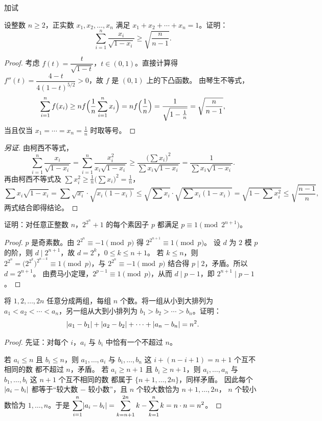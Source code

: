 \documentclass{mojing-exam}
\begin{document}
\begin{paper}[time={9:40—12:10}, full=180]{加试}
\begin{questions}[chinese]
\question[40] 设整数 $n\ge2$，正实数 $x_1,x_2,\dotsc,x_n$ 满足 $x_1+x_2+\dotsb+x_n=1$。证明：
\[
  \sum_{i=1}^{n}\frac{x_i}{\sqrt{1-x_i}}\ge\sqrt{\frac{n}{n-1}} .
\]
\answerspace{8cm}
\begin{proof}
考虑 $f(t)=\dfrac{t}{\sqrt{1-t}}$，$t\in(0,1)$。直接计算得
$f''(t)=\dfrac{4-t}{4(1-t)^{5/2}}>0$，故 $f$ 是 $(0,1)$ 上的下凸函数。
由琴生不等式，
\[
  \sum_{i=1}^nf(x_i)\ge nf\Bigl(\frac{1}{n}\sum_{i=1}^nx_i\Bigr)=nf\Bigl(\frac1n\Bigr)
  =\frac{1}{\sqrt{1-\frac1n}}=\sqrt{\frac{n}{n-1}} ,
\]
当且仅当 $x_1=\dotsb=x_n=\frac1n$ 时取等号。
\end{proof}
\begin{proof}[另证]
由柯西不等式，
\[
  \sum_{i=1}^n\frac{x_i}{\sqrt{1-x_i}}=\sum_{i=1}^n\frac{x_i^2}{x_i\sqrt{1-x_i}}
  \ge\frac{\bigl(\sum x_i\bigr)^2}{\sum x_i\sqrt{1-x_i}}=\frac{1}{\sum x_i\sqrt{1-x_i}} .
\]
再由柯西不等式及 $\sum x_i^2\ge\frac1n\bigl(\sum x_i\bigr)^2=\frac1n$，
\[
  \sum x_i\sqrt{1-x_i}=\sum\sqrt{x_i}\cdot\sqrt{x_i(1-x_i)}
  \le\sqrt{\sum x_i}\cdot\sqrt{\sum x_i(1-x_i)}=\sqrt{1-\sum x_i^2}\le\sqrt{\frac{n-1}{n}} ,
\]
两式结合即得结论。
\end{proof}

\question[50] 证明：对任意正整数 $n$，$2^{2^n}+1$ 的每个素因子 $p$ 都满足 $p\equiv1\pmod{2^{n+1}}$。
\answerspace{8cm}
\begin{proof}
$p$ 是奇素数。由 $2^{2^n}\equiv-1\pmod p$ 得 $2^{2^{n+1}}\equiv1\pmod p$。
设 $d$ 为 $2$ 模 $p$ 的阶，则 $d\mid2^{n+1}$，故 $d=2^k$，$0\le k\le n+1$。
若 $k\le n$，则 $2^{2^n}=\bigl(2^{2^k}\bigr)^{2^{n-k}}\equiv1\pmod p$，与 $2^{2^n}\equiv-1\pmod p$ 结合得
$p\mid2$，矛盾。所以 $d=2^{n+1}$。
由费马小定理，$2^{p-1}\equiv1\pmod p$，从而 $d\mid p-1$，即 $2^{n+1}\mid p-1$。
\end{proof}

\question[50] 将 $1,2,\dotsc,2n$ 任意分成两组，每组 $n$ 个数。将一组从小到大排列为
$a_1<a_2<\dotsb<a_n$，另一组从大到小排列为 $b_1>b_2>\dotsb>b_n$。证明：
\[
  \lvert a_1-b_1\rvert+\lvert a_2-b_2\rvert+\dotsb+\lvert a_n-b_n\rvert=n^2 .
\]
\answerspace{8cm}
\begin{proof}
先证：对每个 $i$，$a_i$ 与 $b_i$ 中恰有一个不超过 $n$。

若 $a_i\le n$ 且 $b_i\le n$，则 $a_1,\dotsc,a_i$ 与 $b_i,\dotsc,b_n$ 这 $i+(n-i+1)=n+1$ 个互不相同的数
都不超过 $n$，矛盾。
若 $a_i\ge n+1$ 且 $b_i\ge n+1$，则 $a_i,\dotsc,a_n$ 与 $b_1,\dotsc,b_i$ 这 $n+1$ 个互不相同的数
都属于 $\{n+1,\dotsc,2n\}$，同样矛盾。
因此每个 $\lvert a_i-b_i\rvert$ 都等于“较大数 $-$ 较小数”，且 $n$ 个较大数恰为 $n+1,\dotsc,2n$，
$n$ 个较小数恰为 $1,\dotsc,n$。于是
$\displaystyle\sum_{i=1}^n\lvert a_i-b_i\rvert=\sum_{k=n+1}^{2n}k-\sum_{k=1}^nk=n\cdot n=n^2$。
\end{proof}
\end{questions}

\end{paper}
\end{document}
